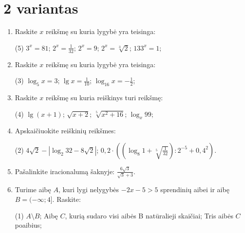 \documentclass[a4paper]{article}
\begin{document}
\section*{2 variantas}

\begin{enumerate}
      \item Raskite $x$ reikšmę su kuria lygybė yra teisinga:

            \begin{tasks}[item-format={\normalfont}, after-item-skip=4mm](5)
                  \task $3^{x}=81$;
                  \task $2^{x}=\frac{1}{32}$;
                  \task $2^{x}=9$;
                  \task $2^{x}=\sqrt[3]{2}$;
                  \task $133^{x}=1$;
            \end{tasks}

      \item Raskite $x$  reikšmę su kuria lygybė yra teisinga:
            \begin{tasks}[item-format={\normalfont}, after-item-skip=4mm](3)
                  \task $\log_{5} x=3$;
                  \task $\lg x=\frac{1}{10}$;
                  \task $\log_{16} x=-\frac{1}{2}$;
            \end{tasks}

      \item Raskite $x$  reikšmę su kuria reiškinys turi reikšmę:
            \begin{tasks}[item-format={\normalfont}, after-item-skip=4mm](4)
                  \task $\lg (x+1)$;
                  \task $\sqrt{x+2}$;
                  \task $\sqrt[5]{x^{2}+16}$;
                  \task $\log_{x}99$;
            \end{tasks}

      \item Apskaičiuokite reiškinių reikšmes:
            \begin{tasks}[item-format={\normalfont}, after-item-skip=10mm](2)
                  \task $4\sqrt{2}-\left|\log_{2}32-8\sqrt{2}\right|$;
                  \task $0,2 \cdot
                        ((\log_{8}1+\sqrt[5]{\frac{1}{32}}):2^{-5}+0,4^2)$.
            \end{tasks}
      \item Pašalinkite iracionalumą šaknyje: $\frac{6\sqrt{3}}{\sqrt{3}+3}$.
      \item Turime aibę $A$, kuri lygi nelygybės $-2x-5>5$ sprendinių aibei ir
            aibę $B=(-\infty;4]$. Raskite:
            \begin{tasks}[item-format={\normalfont}, after-item-skip=2mm](1)
                  \task $A \setminus B$;
                  \task Aibę $C$, kurią sudaro visi aibės B natūralieji
                  skaičiai;
                  \task Tris aibės $C$ poaibius;
            \end{tasks}

\end{enumerate}
\end{document}
